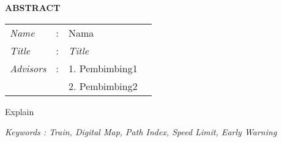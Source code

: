 \begin{center}
\Large\textbf{ABSTRACT}
\end{center}
\vspace{1ex}

\begin{adjustwidth}{-0.2cm}{}
\begin{tabular}{lcp{0.6\linewidth}}
\textit{Name} &:& Nama\\
\textit{Title} &:& \textit{Title} \\
\textit{Advisors} &:& 1. Pembimbing1 \\
& & 2. Pembimbing2 \\
\end{tabular}
\end{adjustwidth}
\vspace{1ex}

	\setlength{\parindent}{0cm} Explain
	\vspace{2ex}
	
	\textit{Keywords : Train, Digital Map, Path Index, Speed Limit, Early Warning}
	\newpage
